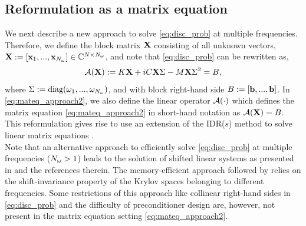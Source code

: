\subsection{Reformulation as a matrix equation}
We next describe a new approach to solve \eqref{eq:disc_prob} at multiple frequencies. Therefore, we define the block matrix ${\mathbf{X}}$ consisting of all unknown vectors, ${\mathbf{X}} := [{\mathbf{x}}_1,...,{\mathbf{x}}_{N_{\omega}}] \in \mathbb{C}^{N \times {N_{\omega}}}$, and note that \eqref{eq:disc_prob} can be rewritten as,
\begin{align}
\label{eq:mateq_approach2}
{\mathcal{A}}({\mathbf{X}}) := K {\mathbf{X}} + i C {\mathbf{X}} \Sigma - M {\mathbf{X}} \Sigma^2 = B,
\end{align}
where $\Sigma := \text{diag}(\omega_1,...,\omega_{{N_{\omega}}})$, and with block right-hand side $B := [\mathbf{b},...,\mathbf{b}]$.
In \eqref{eq:mateq_approach2}, we also define the linear operator ${\mathcal{A}}(\cdot)$
which defines the matrix equation \eqref{eq:mateq_approach2} in short-hand notation as ${\mathcal{A}}({\mathbf{X}}) =
B$. This reformulation gives rise to use an extension of the IDR($s$) method
to solve linear matrix equations \cite{ag15}.\\

Note that an alternative approach to efficiently solve \eqref{eq:disc_prob} at multiple frequencies (${N_{\omega}} > 1$) leads to the solution of shifted linear systems as presented in \cite[Section 4.2]{BG15} and the references therein. The memory-efficient approach followed by \cite{BG15} relies on the shift-invariance property of the Krylov spaces belonging to different frequencies. Some restrictions of this approach like collinear right-hand sides in \eqref{eq:disc_prob} and the difficulty of preconditioner design are, however, not present in the matrix equation setting \eqref{eq:mateq_approach2}. 
